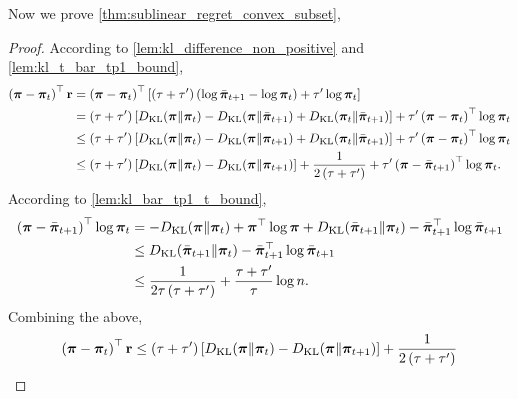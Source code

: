 Now we prove \cref{thm:sublinear_regret_convex_subset},
\begin{proof}
According to \cref{lem:kl_difference_non_positive} and \cref{lem:kl_t_bar_tp1_bound},
\begin{equation*}
\begin{split}
    \left( {\boldsymbol{\pi}} - {\boldsymbol{\pi}}_t \right)^\top {\mathbf{r}} &= \left( {\boldsymbol{\pi}} - {\boldsymbol{\pi}}_t \right)^\top \left[ \left(\tau + \tau^\prime\right) \left( \log{\bar{{\boldsymbol{\pi}}}_{t+1}} - \log{{\boldsymbol{\pi}}_t} \right) + \tau^\prime \log{{\boldsymbol{\pi}}_t} \right] \\
    &= \left(\tau + \tau^\prime\right) \left[ D_{\mathrm{KL}}{\left( {\boldsymbol{\pi}} \middle\| {\boldsymbol{\pi}}_t \right)} - D_{\mathrm{KL}}{\left( {\boldsymbol{\pi}} \middle\| \bar{{\boldsymbol{\pi}}}_{t+1} \right)} + D_{\mathrm{KL}}{\left( {\boldsymbol{\pi}}_t \middle\| \bar{{\boldsymbol{\pi}}}_{t+1} \right)}  \right] + \tau^\prime \left( {\boldsymbol{\pi}} - {\boldsymbol{\pi}}_t \right)^\top \log{{\boldsymbol{\pi}}_t} \\
    &\le \left(\tau + \tau^\prime\right) \left[ D_{\mathrm{KL}}{\left( {\boldsymbol{\pi}} \middle\| {\boldsymbol{\pi}}_t \right)} - D_{\mathrm{KL}}{\left( {\boldsymbol{\pi}} \middle\| {\boldsymbol{\pi}}_{t+1} \right)} + D_{\mathrm{KL}}{\left( {\boldsymbol{\pi}}_t \middle\| \bar{{\boldsymbol{\pi}}}_{t+1} \right)}  \right] + \tau^\prime \left( {\boldsymbol{\pi}} - {\boldsymbol{\pi}}_t \right)^\top \log{{\boldsymbol{\pi}}_t} \\
    &\le \left(\tau + \tau^\prime\right) \left[ D_{\mathrm{KL}}{\left( {\boldsymbol{\pi}} \middle\| {\boldsymbol{\pi}}_t \right)} - D_{\mathrm{KL}}{\left( {\boldsymbol{\pi}} \middle\| {\boldsymbol{\pi}}_{t+1} \right)} \right] + \frac{1}{2\left(\tau + \tau^\prime\right)} + \tau^\prime \left( {\boldsymbol{\pi}} - \bar{{\boldsymbol{\pi}}}_{t+1} \right)^\top \log{{\boldsymbol{\pi}}_t}.
\end{split}
\end{equation*}
According to \cref{lem:kl_bar_tp1_t_bound},
\begin{equation*}
\begin{split}
    \left( {\boldsymbol{\pi}} - \bar{{\boldsymbol{\pi}}}_{t+1} \right)^\top \log{{\boldsymbol{\pi}}_t} &= - D_{\mathrm{KL}}{\left( {\boldsymbol{\pi}} \middle\| {\boldsymbol{\pi}}_t \right)} + {\boldsymbol{\pi}}^\top \log{{\boldsymbol{\pi}}} + D_{\mathrm{KL}}{\left( \bar{{\boldsymbol{\pi}}}_{t+1} \middle\| {\boldsymbol{\pi}}_t \right)} - \bar{{\boldsymbol{\pi}}}_{t+1}^\top \log{\bar{{\boldsymbol{\pi}}}_{t+1}} \\
    &\le D_{\mathrm{KL}}{\left( \bar{{\boldsymbol{\pi}}}_{t+1} \middle\| {\boldsymbol{\pi}}_t \right)} - \bar{{\boldsymbol{\pi}}}_{t+1}^\top \log{\bar{{\boldsymbol{\pi}}}_{t+1}} \\
    &\le \frac{1}{2\tau \left(\tau + \tau^\prime\right)} + \frac{\tau + \tau^\prime}{\tau} \log{n}.
\end{split}
\end{equation*}
Combining the above,
\begin{equation*}
\begin{split}
    \left( \rvpi - \rvpi_t \right)^\top \rvr &\le \left(\tau + \tau^\prime\right) \left[ \KL{\left( \rvpi \middle\| \rvpi_t \right)} - \KL{\left( \rvpi \middle\| \rvpi_{t+1} \right)} \right] + \frac{1}{2\left(\tau + \tau^\prime\right)} \\

\end{split}
\end{equation*}
\end{proof}
